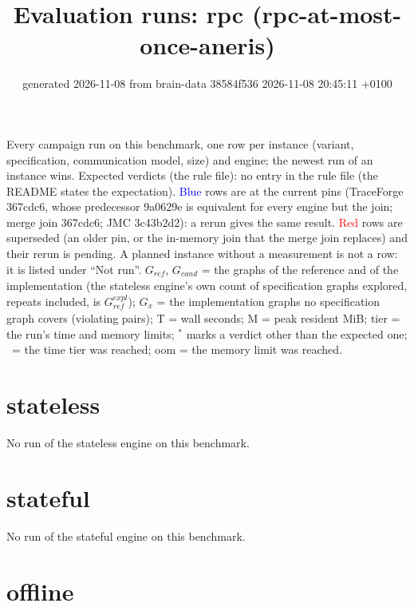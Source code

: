 \documentclass[10pt]{article}
\title{Evaluation runs: \textsf{rpc} (rpc-at-most-once-aneris)}
\author{}
\date{generated 2026-11-08 from brain-data 38584f536 2026-11-08 20:45:11 +0100}
\begin{document}
\maketitle\small
\noindent Every campaign run on this benchmark, one row per instance (variant, specification, communication model, size) and engine; the newest run of an instance wins. Expected verdicts (the rule file): no entry in the rule file (the README states the expectation). \textcolor{blue}{Blue} rows are at the current pins (TraceForge 367cdc6, whose predecessor 9a0629e is equivalent for every engine but the join; merge join 367cdc6; JMC 3c43b2d2): a rerun gives the same result. \textcolor{red}{Red} rows are superseded (an older pin, or the in-memory join that the merge join replaces) and their rerun is pending. A planned instance without a measurement is not a row: it is listed under ``Not run''. $G_{\mathit{ref}}$, $G_{\mathit{cand}}$ = the graphs of the reference and of the implementation (the stateless engine's own count of specification graphs explored, repeats included, is $G_{\mathit{ref}}^{\mathit{expl}}$); $G_x$ = the implementation graphs no specification graph covers (violating pairs); T = wall seconds; M = peak resident MiB; tier = the run's time and memory limits; $^{\ast}$ marks a verdict other than the expected one; \faClock\ = the time tier was reached; oom = the memory limit was reached.

\section*{stateless}\noindent No run of the stateless engine on this benchmark.
\section*{stateful}\noindent No run of the stateful engine on this benchmark.
\section*{offline}
\end{document}
